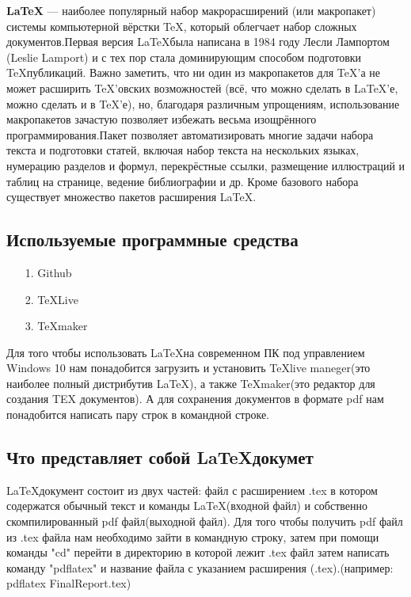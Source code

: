 \documentclass[a4paper,12pt]{report}
\begin{document}
\textbf{\LaTeX} — наиболее популярный набор макрорасширений (или макропакет) системы компьютерной вёрстки \TeX, который облегчает набор сложных документов.Первая версия \LaTeX была написана в 1984 году Лесли Лампортом (Leslie Lamport) и с тех пор стала доминирующим способом подготовки \TeX публикаций. Важно заметить, что ни один из макропакетов для \TeX ’а не может расширить \TeX ’овских возможностей (всё, что можно сделать в LaTeX’е, можно сделать и в \TeX ’е), но, благодаря различным упрощениям, использование макропакетов зачастую позволяет избежать весьма изощрённого программирования.Пакет позволяет автоматизировать многие задачи набора текста и подготовки статей, включая набор текста на нескольких языках, нумерацию разделов и формул, перекрёстные ссылки, размещение иллюстраций и таблиц на странице, ведение библиографии и др. Кроме базового набора существует множество пакетов расширения \LaTeX.

\subsection{Используемые программные средства}
\begin{itemize}
\item[1.]Github

\item[2.]\TeX Live

\item[3.]\TeX maker
\end{itemize}
Для того чтобы использовать \LaTeX на современном ПК под управлением Windows 10 нам понадобится загрузить и установить \TeX live maneger(это наиболее полный дистрибутив \LaTeX), а также \TeX maker(это редактор для создания TEX документов). А для сохранения документов в формате pdf нам понадобится написать пару строк в командной строке.

\subsection{Что представляет собой \LaTeX докумет}
\LaTeX документ состоит из двух частей: файл с расширением .tex в котором содержатся обычный текст и команды \LaTeX(входной файл) и собственно скомпилированный pdf файл(выходной файл). Для того чтобы получить pdf файл из .tex файла нам необходимо зайти в командную строку, затем при помощи команды "cd" перейти в директорию в которой лежит .tex файл затем написать команду "pdflatex" и название файла с указанием расширения (.tex).(например: pdflatex FinalReport.tex)
\end{document}
